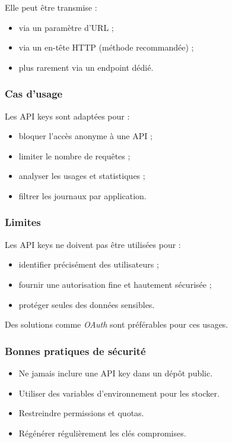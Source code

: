 \documentclass{article}
\begin{document}
Elle peut être transmise :
\begin{itemize}
    \item via un paramètre d’URL ;
    \item via un en-tête HTTP (méthode recommandée) ;
    \item plus rarement via un endpoint dédié.
\end{itemize}

\subsubsection{Cas d’usage}

Les API keys sont adaptées pour :
\begin{itemize}
    \item bloquer l’accès anonyme à une API ;
    \item limiter le nombre de requêtes ;
    \item analyser les usages et statistiques ;
    \item filtrer les journaux par application.
\end{itemize}

\subsubsection{Limites}

Les API keys ne doivent pas être utilisées pour :
\begin{itemize}
    \item identifier précisément des utilisateurs ;
    \item fournir une autorisation fine et hautement sécurisée ;
    \item protéger seules des données sensibles.
\end{itemize}

Des solutions comme \emph{OAuth} sont préférables pour ces usages.

\subsubsection{Bonnes pratiques de sécurité}

\begin{itemize}
    \item Ne jamais inclure une API key dans un dépôt public.
    \item Utiliser des variables d’environnement pour les stocker.
    \item Restreindre permissions et quotas.
    \item Régénérer régulièrement les clés compromises.
\end{itemize}
\end{document}
